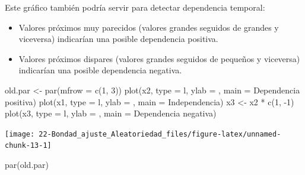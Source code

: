 \documentclass[
]{book}
\newenvironment{Shaded}{\begin{snugshade}}{\end{snugshade}}
\newcommand{\AttributeTok}[1]{\textcolor[rgb]{0.77,0.63,0.00}{#1}}
\newcommand{\DecValTok}[1]{\textcolor[rgb]{0.00,0.00,0.81}{#1}}
\newcommand{\FunctionTok}[1]{\textcolor[rgb]{0.00,0.00,0.00}{#1}}
\newcommand{\NormalTok}[1]{#1}
\newcommand{\OtherTok}[1]{\textcolor[rgb]{0.56,0.35,0.01}{#1}}
\newcommand{\SpecialCharTok}[1]{\textcolor[rgb]{0.00,0.00,0.00}{#1}}
\newcommand{\StringTok}[1]{\textcolor[rgb]{0.31,0.60,0.02}{#1}}
\theoremstyle{break}
\theoremstyle{nonumberplain}
\begin{document}
Este gráfico también podría servir para detectar dependencia temporal:

\begin{itemize}
\item
  Valores próximos muy parecidos (valores grandes seguidos de grandes
  y viceversa) indicarían una posible dependencia positiva.
\item
  Valores próximos dispares (valores grandes seguidos de pequeños
  y viceversa) indicarían una posible dependencia negativa.
\end{itemize}

\begin{Shaded}
\begin{Highlighting}[]
\NormalTok{old.par }\OtherTok{\textless{}{-}} \FunctionTok{par}\NormalTok{(}\AttributeTok{mfrow =} \FunctionTok{c}\NormalTok{(}\DecValTok{1}\NormalTok{, }\DecValTok{3}\NormalTok{))}
\FunctionTok{plot}\NormalTok{(x2, }\AttributeTok{type =} \StringTok{\textquotesingle{}l\textquotesingle{}}\NormalTok{, }\AttributeTok{ylab =} \StringTok{\textquotesingle{}\textquotesingle{}}\NormalTok{, }\AttributeTok{main =} \StringTok{\textquotesingle{}Dependencia positiva\textquotesingle{}}\NormalTok{)}
\FunctionTok{plot}\NormalTok{(x1, }\AttributeTok{type =} \StringTok{\textquotesingle{}l\textquotesingle{}}\NormalTok{, }\AttributeTok{ylab =} \StringTok{\textquotesingle{}\textquotesingle{}}\NormalTok{, }\AttributeTok{main =} \StringTok{\textquotesingle{}Independencia\textquotesingle{}}\NormalTok{)}
\NormalTok{x3 }\OtherTok{\textless{}{-}}\NormalTok{ x2 }\SpecialCharTok{*} \FunctionTok{c}\NormalTok{(}\DecValTok{1}\NormalTok{, }\SpecialCharTok{{-}}\DecValTok{1}\NormalTok{)}
\FunctionTok{plot}\NormalTok{(x3, }\AttributeTok{type =} \StringTok{\textquotesingle{}l\textquotesingle{}}\NormalTok{, }\AttributeTok{ylab =} \StringTok{\textquotesingle{}\textquotesingle{}}\NormalTok{, }\AttributeTok{main =} \StringTok{\textquotesingle{}Dependencia negativa\textquotesingle{}}\NormalTok{)}
\end{Highlighting}
\end{Shaded}

\begin{center}\texttt{[image: 22-Bondad\_ajuste\_Aleatoriedad\_files/figure-latex/unnamed-chunk-13-1]} \end{center}

\begin{Shaded}
\begin{Highlighting}[]
\FunctionTok{par}\NormalTok{(old.par)}
\end{Highlighting}
\end{Shaded}
\end{document}
